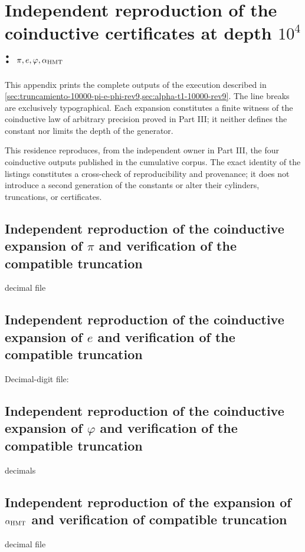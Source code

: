 \chapter{Independent reproduction of the coinductive certificates at depth \texorpdfstring{\(10^4\)}{10^4}: \texorpdfstring{\(\pi,e,\varphi,\alpha_{\rm HMT}\)}{pi, e, phi, alpha HMT}}
\label{app:desarrollos-10000-rev9-p3-procedencia}

This appendix prints the complete outputs of the execution described in
\cref{sec:truncamiento-10000-pi-e-phi-rev9,sec:alpha-t1-10000-rev9}. The
line breaks are exclusively typographical. Each expansion constitutes
a finite witness of the coinductive law of arbitrary precision proved in
Part III; it neither defines the constant nor limits the depth of the generator.

\begingroup
\lstset{basicstyle=\ttfamily\tiny,breaklines=true,breakatwhitespace=false,
  frame=single,columns=fullflexible,keepspaces=true,numbers=none}

This residence reproduces, from the independent owner in Part III,
the four coinductive outputs published in the cumulative corpus. The
exact identity of the listings constitutes a cross-check of
reproducibility and provenance; it does not introduce a second generation of the
constants or alter their cylinders, truncations, or certificates.

\section{Independent reproduction of the coinductive expansion of \(\pi\) and verification of the compatible truncation}
decimal file 

\section{Independent reproduction of the coinductive expansion of \(e\) and verification of the compatible truncation}
Decimal-digit file: 

\section{Independent reproduction of the coinductive expansion of \(\varphi\) and verification of the compatible truncation}
 decimals


\section{Independent reproduction of the expansion of \texorpdfstring{\(\alpha_{\rm HMT}\)}{HMT alpha} and verification of compatible truncation}
decimal file 
\endgroup
